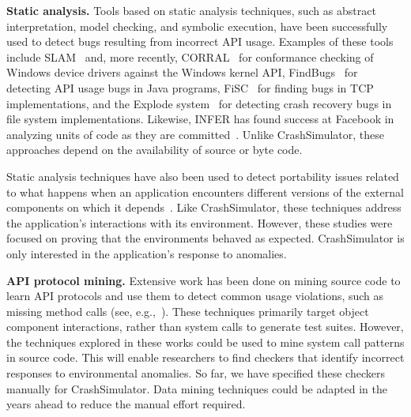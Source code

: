 \noindent
{\bf Static analysis. }
\label{rel-static-analysis}
Tools based on static analysis techniques, such as abstract interpretation,
model checking, and symbolic execution, have been successfully
used to
detect bugs resulting from incorrect API usage. Examples of these tools
include
SLAM~\cite{Ball_adecade, Ball:2002:SLP:503272.503274} and, more recently,
CORRAL~\cite{DBLP:conf/sigsoft/LalQ14} for conformance checking of Windows
device drivers against the Windows kernel API,
FindBugs~\cite{DBLP:conf/oopsla/HovemeyerP04} for detecting API usage bugs
in Java programs, FiSC~\cite{Musuvathi04modelchecking} for finding bugs in
TCP implementations, and the Explode
system~\cite{Yang:2006:ELG:1298455.1298469} for detecting crash recovery
bugs in file system implementations.  Likewise, INFER has found success at
Facebook in analyzing units of code as they are
committed~\cite{INFERFacebook}. Unlike CrashSimulator, these
approaches depend on the availability of source or byte code.

Static analysis techniques have also been
used to detect portability issues related to what happens when an
application encounters different
versions of the external components on which
it depends~\cite{silakov2010improving, javacompliance-www}. Like
CrashSimulator, these techniques
address the application's interactions with its
environment. However, these studies were focused on proving that the
environments behaved as expected.
CrashSimulator is only interested in the application's
response to anomalies.

\iffalse
\noindent
{\bf Specification and run-time verification.}
Substantial work has been done in validating API and protocol behaviors,
e.g., finding faults in the Linux TCP implementation, SSH2 and
RCP~\cite{Udrea:2008}, BGP configuration~\cite{Feamster:2005}, and
identifying network vulnerabilities~\cite{ritchey-sp00}.
\fi

\noindent
{\bf API protocol mining.}
Extensive work has been done on mining source code to learn API protocols
and use them to detect common usage violations, such as missing method calls
(see, e.g.,~\cite{mariani2007compatibility,
DBLP:journals/ase/WasylkowskiZ11, DBLP:conf/icse/PradelJAG12,
DBLP:journals/tosem/MonperrusM13, DBLP:conf/icse/JamrozikSZ16}). These
techniques primarily target object component interactions, rather than
system calls to generate test suites. However, the techniques explored in
these works could be used to mine system call patterns in source code.
This will enable researchers
to find checkers that identify incorrect responses to environmental
anomalies. So far, we have specified these checkers manually for
CrashSimulator.  Data mining techniques could be adapted in the years
ahead to reduce the manual effort required.


